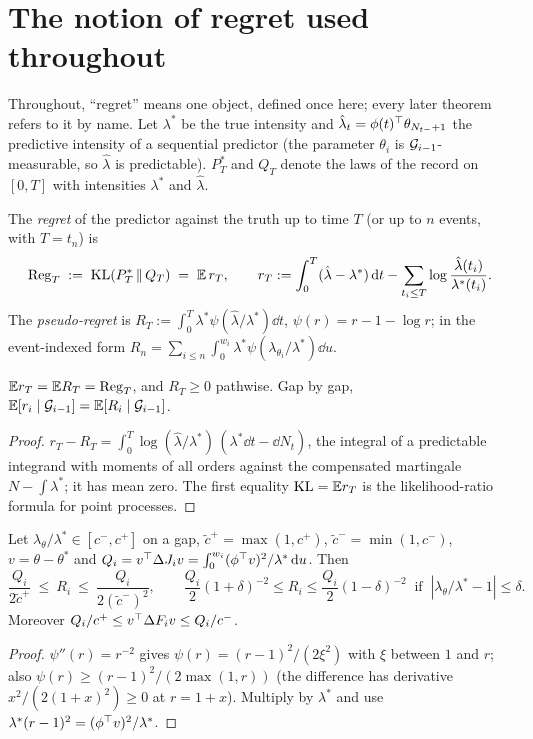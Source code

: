 \section{The notion of regret used throughout}\label{sec:regretnotion}

Throughout, ``regret'' means one object, defined once here; every later theorem refers to it by name.
Let $\lambda^*$ be the true intensity and $\hat\lambda_t=\phi(t)^{\top}\theta_{N_{t-}+1}$ the predictive intensity of a sequential predictor (the parameter $\theta_i$ is $\mathcal G_{i-1}$-measurable, so $\hat\lambda$ is predictable). $P^*_T$ and $Q_T$ denote the laws of the record on $[0,T]$ with intensities $\lambda^*$ and $\hat\lambda$.

\begin{definition}[regret]\label{def:regret}
The \emph{regret} of the predictor against the truth up to time $T$ (or up to $n$ events, with $T=t_n$) is
\[
\mathrm{Reg}_T\;:=\;\mathrm{KL}(P^*_T\,\|\,Q_T)\;=\;\mathbb{E}\,r_T,\qquad
r_T:=\int_0^T(\hat\lambda-\lambda^*)\,\mathrm d t-\sum_{t_i\le T}\log\frac{\hat\lambda(t_i)}{\lambda^*(t_i)} .
\]
The \emph{pseudo-regret} is $R_T:=\int_0^T\lambda^*\psi(\hat\lambda/\lambda^*)\dd t$, $\psi(r)=r-1-\log r$; in the event-indexed form $R_n=\sum_{i\le n}\int_0^{w_i}\lambda^*\psi(\lambda_{\theta_i}/\lambda^*)\dd u$.
\end{definition}

\begin{lemma}[identity]\label{lem:regid}\Pt{}
$\mathbb{E} r_T=\mathbb{E} R_T=\mathrm{Reg}_T$, and $R_T\ge0$ pathwise. Gap by gap, $\mathbb{E}[r_i\mid\mathcal G_{i-1}]=\mathbb{E}[R_i\mid\mathcal G_{i-1}]$.
\end{lemma}
\begin{proof}
$r_T-R_T=\int_0^T\log(\hat\lambda/\lambda^*)\,(\lambda^*\dd t-\dd N_t)$, the integral of a predictable integrand with moments of all orders against the compensated martingale $N-\int\lambda^*$; it has mean zero. The first equality $\mathrm{KL}=\mathbb{E} r_T$ is the likelihood-ratio formula for point processes.
\end{proof}

\begin{lemma}\label{lem:regsand}\Pt{}
Let $\lambda_\theta/\lambda^*\in[c^-,c^+]$ on a gap, $\tilde c^+=\max(1,c^+)$, $\tilde c^-=\min(1,c^-)$, $v=\theta-\theta^*$ and $Q_i=v^{\top}\Delta J_iv=\int_0^{w_i}(\phi^{\top} v)^2/\lambda^*\,\mathrm d u$. Then
\[
\frac{Q_i}{2\tilde c^{+}}\ \le\ R_i\ \le\ \frac{Q_i}{2(\tilde c^{-})^{2}},
\qquad
\frac{Q_i}{2}(1+\delta)^{-2}\le R_i\le\frac{Q_i}{2}(1-\delta)^{-2}\ \text{ if }\ |\lambda_\theta/\lambda^*-1|\le\delta .
\]
Moreover $Q_i/c^+\le v^{\top}\Delta F_iv\le Q_i/c^-$.
\end{lemma}
\begin{proof}
$\psi''(r)=r^{-2}$ gives $\psi(r)=(r-1)^2/(2\xi^2)$ with $\xi$ between $1$ and $r$; also $\psi(r)\ge(r-1)^2/(2\max(1,r))$ (the difference has derivative $x^2/(2(1+x)^2)\ge0$ at $r=1+x$). Multiply by $\lambda^*$ and use $\lambda^*(r-1)^2=(\phi^{\top} v)^2/\lambda^*$.
\end{proof}

